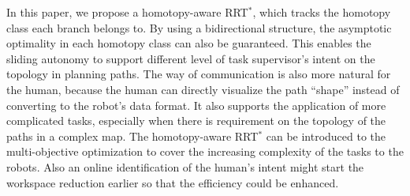 \documentclass[letterpaper, 10 pt, conference]{ieeeconf}
\begin{document}
In this paper, we propose a homotopy-aware RRT$^{*}$, which tracks the homotopy class each branch belongs to.
By using a bidirectional structure, the asymptotic optimality in each homotopy class can also be guaranteed.
This enables the sliding autonomy to support different level of task supervisor's intent on the topology in planning paths.
The way of communication is also more natural for the human, because the human can directly visualize the path ``shape'' instead of converting to the robot's data format.
It also supports the application of more complicated tasks, especially when there is requirement on the topology of the paths in a complex map.
The homotopy-aware RRT$^{*}$ can be introduced to the multi-objective optimization to cover the increasing complexity of the tasks to the robots.
Also an online identification of the human's intent might start the workspace reduction earlier so that the efficiency could be enhanced.



\end{document}
